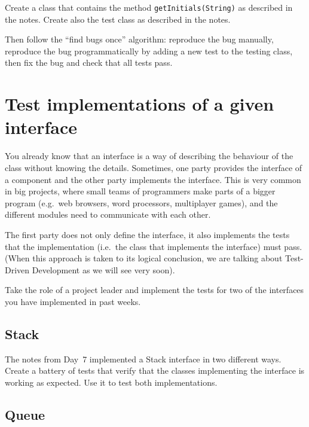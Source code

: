 \documentclass{article}
\begin{document}
Create a class that contains the method \verb+getInitials(String)+ as
described in the notes. Create also the test class as described in the
notes. 

Then follow the ``find bugs once'' algorithm: reproduce the bug manually,
reproduce the bug programmatically by adding a new test to the testing
class, then fix the bug and check that all tests pass. 





\section{Test implementations of a given interface}
\label{sec:test-impl-given}

You already know that an interface is a way of describing the
behaviour of the class without knowing the details. Sometimes, one
party provides the interface of a component and the other party
implements the interface. This is very common in big projects, where
small teams of programmers make parts of a bigger program (e.g.~web
browsers, word processors, multiplayer games), and the different
modules need to communicate with each other. 

The first party does not only define the interface, it also implements
the tests that the implementation (i.e.~the class that implements the
interface) must pass. (When this approach is taken to its logical
conclusion, we are talking about Test-Driven Development as we will
see very soon). 

Take the role of a project leader and implement the tests for two of
the interfaces you have implemented in past weeks. 

\subsection{Stack}
\label{sec:stack3}

The notes from Day~7 implemented a Stack interface in two different
ways. Create a battery of tests that verify that the classes
implementing the interface is working as expected. Use it to test both
implementations.

\subsection{Queue}
\label{sec:stack2}
\end{document}
